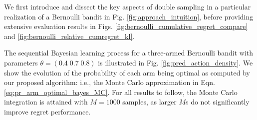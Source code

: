 \documentclass[10pt]{article}
\newcommand{\ie}{i.e., }
\begin{document}
We first introduce and dissect the key aspects of double sampling in a particular realization of a Bernoulli bandit in Fig. \ref{fig:approach_intuition}, before providing extensive evaluation results in Figs. \ref{fig:bernoulli_cumulative_regret_compare} and \ref{fig:bernoulli_relative_cumregret_kl}.

The sequential Bayesian learning process for a three-armed Bernoulli bandit with parameters $\theta=\left(0.4 \; 0.7 \; 0.8 \right)$ is illustrated in Fig. \ref{fig:pred_action_density}. We show the evolution of the probability of each arm being optimal as computed by our proposed algorithm: \ie the Monte Carlo approximation in Eqn. \ref{eq:pr_arm_optimal_bayes_MC}. For all results to follow, the Monte Carlo integration is attained with $M=1000$ samples, as larger $M$s do not significantly improve regret performance.
\end{document}
